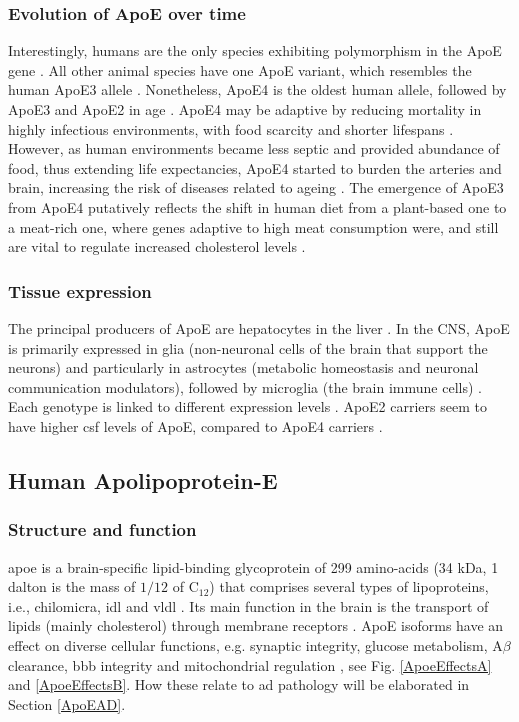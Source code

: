 \documentclass{amsart}
\begin{document}
\subsubsection{Evolution of ApoE over time}
Interestingly, humans are the only species exhibiting polymorphism in the ApoE gene \cite{Yassine2020APOEDisease}. All other animal species have one ApoE variant, which resembles the human ApoE3 allele \cite{Hunsberger2019TheInterventions}. Nonetheless, ApoE4 is the oldest human allele, followed by ApoE3 and ApoE2 in age \cite{Yassine2020APOEDisease}. ApoE4 may be adaptive by reducing mortality in highly infectious environments, with food scarcity and shorter lifespans \cite{Trumble2017ApolipoproteinBurden}. However, as human environments became less septic and provided abundance of food, thus extending life expectancies,  ApoE4 started to burden the arteries and brain, increasing the risk of diseases related to ageing \cite{Yassine2020APOEDisease}. The emergence of ApoE3 from ApoE4 putatively reflects the shift in human diet from a plant-based one to a meat-rich one, where genes adaptive to high meat consumption were, and still are vital to regulate increased cholesterol levels \cite{Finch1999TheIsoforms}. 

\subsubsection{Tissue expression}
The principal producers of ApoE are hepatocytes in the liver \cite{Mahley2016CentralMetabolism}. In the CNS, ApoE is primarily expressed in glia (non-neuronal cells of the brain that support the neurons) and particularly in astrocytes (metabolic homeostasis and neuronal communication modulators), followed by microglia (the brain immune cells) \cite{Lanfranco2021ExpressionInflammation}. Each genotype is linked to different expression levels \cite{Husain2021APOETherapeutics}. ApoE2 carriers seem to have higher \acrfull{csf} levels of ApoE, compared to ApoE4 carriers \cite{Castellano2011HumanClearance, Cruchaga2012CerebrospinalDisease}. 

\subsection{Human Apolipoprotein-E}\label{ApoEprot}
\subsubsection{Structure and function}
\acrshort{apoe} is a brain-specific lipid-binding glycoprotein of 299 amino-acids (34 kDa, 1 dalton is the mass of $1/12$ of C$_{12}$) that comprises several types of lipoproteins, i.e., chilomicra, \acrlong{idl} and \acrlong{vldl} \cite{Husain2021APOETherapeutics}. Its main function in the brain is the transport of lipids (mainly cholesterol) through membrane receptors \cite{Yang2023ApolipoproteinDisease}. ApoE isoforms have an effect on diverse cellular functions, e.g. synaptic integrity, glucose metabolism, A$\beta$ clearance, \acrlong{bbb} integrity and mitochondrial regulation \cite{Husain2021APOETherapeutics}, see Fig. \ref{ApoeEffectsA} and \ref{ApoeEffectsB}. How these relate to \acrshort{ad} pathology will be elaborated in Section \ref{ApoEAD}.
\end{document}
